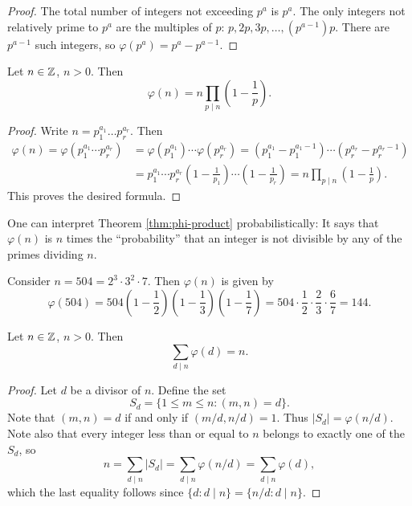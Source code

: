 \begin{proof}
  The total number of integers
  not exceeding $p^a$ is $p^a$. The only
  integers not relatively prime to
  $p^a$ are the multiples of $p$:
  $p, 2p, 3p, \dots, (p^{a - 1}) p$.
  There are $p^{a - 1}$ such integers, so
  $\varphi(p^a) = p^a - p^{a - 1}$.
\end{proof}

\begin{theorem}\label{thm:phi-product}
  Let $n \in \mathbb{Z}$, $n > 0$. Then
  \[
    \varphi(n) = n \prod_{p \mid n} \left(1 - \frac{1}{p}\right).
  \]
\end{theorem}

\begin{proof}
  Write $n = p_1^{a_1} \dots p_r^{a_r}$.
  Then
  \begin{align*}
    \varphi(n)
    = \varphi(p_1^{a_1} \cdots p_r^{a_r})
    &= \varphi(p_1^{a_1}) \cdots \varphi(p_r^{a_r})
    = (p_1^{a_1} - p_1^{a_1 - 1}) \cdots (p_r^{a_r} - p_r^{a_r - 1}) \\
    &= p_1^{a_1} \cdots p_r^{a_r} \left(1 - \frac{1}{p_1}\right) \cdots \left(1 - \frac{1}{p_r}\right)
    = n \prod_{p \mid n} \left(1 - \frac{1}{p}\right).
  \end{align*}
  This proves the desired formula.
\end{proof}

\begin{remark}
  One can interpret
  Theorem \ref{thm:phi-product}
  probabilistically: It says that
  $\varphi(n)$ is $n$ times the ``probability''
  that an integer is not divisible by any
  of the primes dividing $n$.
\end{remark}

\begin{example}
  Consider $n = 504 = 2^3 \cdot 3^2 \cdot 7$.
  Then $\varphi(n)$ is given by
  \[
    \varphi(504)
    = 504 \left(1 - \frac{1}{2}\right)
    \left(1 - \frac{1}{3}\right)
    \left(1 - \frac{1}{7}\right)
    = 504 \cdot \frac{1}{2} \cdot \frac{2}{3} \cdot \frac{6}{7} = 144.
  \]
\end{example}

\begin{theorem}[Gauss]\label{thm:euler-phi-sum}
  Let $n \in \mathbb{Z}$, $n > 0$. Then
  \[
    \sum_{d \mid n} \varphi(d) = n.
  \]
\end{theorem}

\begin{proof}
  Let $d$ be a divisor of $n$. Define
  the set
  \[
    S_d = \{1 \le m \le n : (m, n) = d\}.
  \]
  Note that $(m, n) = d$ if and only if
  $(m / d, n / d) = 1$. Thus
  $|S_d| = \varphi(n / d)$. Note also
  that every integer less than or equal to
  $n$ belongs to exactly one of the
  $S_d$, so
  \[
    n = \sum_{d \mid n} |S_d| = \sum_{d \mid n} \varphi(n / d)
    = \sum_{d \mid n} \varphi(d),
  \]
  which the last equality follows since
  $\{d : d \mid n\} = \{n / d : d \mid n\}$.
\end{proof}

